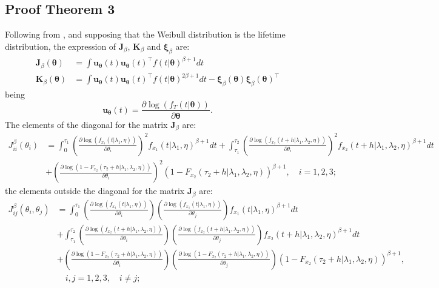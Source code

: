 \documentclass{article}
\begin{document}
\subsection{Proof Theorem 3}
Following from \citet{basu1997}, and supposing that the Weibull distribution is the lifetime distribution, the expression of $\bm{J}_{\beta}$, $\bm{K}_{\beta}$ and $\bm{\xi}_{\beta}$ are:
\begin{align*}
\bm{J}_{\beta}\left(\bm{\theta}\right)&=\int \bm{u}_{\bm{\theta}}(t)\bm{u}_{\bm{\theta}}(t)^{\intercal}f(t|\bm{\theta})^{\beta+1}dt
\\
\bm{K}_{\beta}\left(\bm{\theta}\right)&=\int \bm{u}_{\bm{\theta}}(t)\bm{u}_{\bm{\theta}}(t)^{\intercal}f(t|\bm{\theta})^{2\beta+1}dt-\bm{\xi}_{\beta}\left(\bm{\theta}\right)\bm{\xi}_{\beta}\left(\bm{\theta}\right)^{\intercal}
\end{align*}
being
\begin{equation*}
\bm{u}_{\bm{\theta}}(t)=\frac{\partial \log\left(f_{T}\left(t|\bm{\theta}\right)\right)}{\partial \bm{\theta}}.
\end{equation*}
The elements of the diagonal for the matrix $\mathbf{J}_{\beta}$ are:
\begin{align*}
J_{ii}^{\beta}(\theta_i)&=\int_0^{\tau_1}\left(\frac{\partial\log(f_{x_1}(t|\lambda_1,\eta))}{\partial \theta_i}\right)^2 f_{x_1}(t|\lambda_1,\eta)^{\beta+1}dt+\int_{\tau_1}^{\tau_2}\left(\frac{\partial\log(f_{x_2}(t+h|\lambda_1,\lambda_2,\eta))}{\partial \theta_i}\right)^2 f_{x_2}(t+h|\lambda_1,\lambda_2,\eta)^{\beta+1}dt
\\
&+\left(\frac{\partial\log(1-F_{x_2}(\tau_2+h|\lambda_1,\lambda_2,\eta))}{\partial \theta_i}\right)^2 (1-F_{x_2}(\tau_2+h|\lambda_1,\lambda_2,\eta))^{\beta+1}, \quad i=1,2,3;
\end{align*}
the elements outside the diagonal for the matrix $\mathbf{J}_{\beta}$ are:
\begin{align*}
J_{ij}^{\beta}(\theta_i,\theta_j)&=\int_0^{\tau_1}\left(\frac{\partial\log(f_{x_1}(t|\lambda_1,\eta))}{\partial \theta_i}\right) \left(\frac{\partial\log(f_{x_1}(t|\lambda_1,\eta))}{\partial \theta_j}\right) f_{x_1}(t|\lambda_1,\eta)^{\beta+1}dt
\\
&+\int_{\tau_1}^{\tau_2}\left(\frac{\partial\log(f_{x_2}(t+h|\lambda_1,\lambda_2,\eta))}{\partial \theta_i}\right) \left(\frac{\partial\log(f_{x_2}(t+h|\lambda_1,\lambda_2,\eta))}{\partial \theta_j}\right)f_{x_2}(t+h|\lambda_1,\lambda_2,\eta)^{\beta+1}dt
\\
&+\left(\frac{\partial\log(1-F_{x_2}(\tau_2+h|\lambda_1,\lambda_2,\eta))}{\partial \theta_i}\right) \left(\frac{\partial\log(1-F_{x_2}(\tau_2+h|\lambda_1,\lambda_2,\eta))}{\partial \theta_j}\right)(1-F_{x_2}(\tau_2+h|\lambda_1,\lambda_2,\eta))^{\beta+1},
\\
& \quad i,j=1,2,3, \quad i \neq j;
\end{align*}
\end{document}
